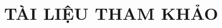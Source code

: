 \documentclass[10pt, a4paper, twocolumn]{article}
\begin{document}
\newpage












\section*{TÀI LIỆU THAM KHẢO}
\printbibliography[heading=none]
\end{document}

